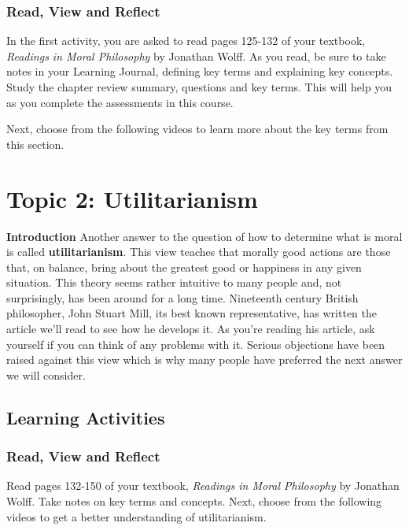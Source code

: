 \documentclass[
]{book}
\begin{document}
\begin{reflect}
\hypertarget{read-view-and-reflect-11}{%
\subsubsection*{Read, View and Reflect}\label{read-view-and-reflect-11}}

In the first activity, you are asked to read pages 125-132 of your textbook, \emph{Readings in Moral Philosophy} by Jonathan Wolff. As you read, be sure to take notes in your Learning Journal, defining key terms and explaining key concepts. Study the chapter review summary, questions and key terms. This will help you as you complete the assessments in this course.

Next, choose from the following videos to learn more about the key terms from this section.
\end{reflect}

\hypertarget{topic-2-utilitarianism}{%
\section*{Topic 2: Utilitarianism}\label{topic-2-utilitarianism}}

\textbf{Introduction}
Another answer to the question of how to determine what is moral is called \textbf{utilitarianism}. This view teaches that morally good actions are those that, on balance, bring about the greatest good or happiness in any given situation. This theory seems rather intuitive to many people and, not surprisingly, has been around for a long time. Nineteenth century British philosopher, John Stuart Mill, its best known representative, has written the article we'll read to see how he develops it.
As you're reading his article, ask yourself if you can think of any problems with it. Serious objections have been raised against this view which is why many people have preferred the next answer we will consider.

\hypertarget{learning-activities-9}{%
\subsection*{Learning Activities}\label{learning-activities-9}}

\begin{reflect}
\hypertarget{read-view-and-reflect-12}{%
\subsubsection*{Read, View and Reflect}\label{read-view-and-reflect-12}}

Read pages 132-150 of your textbook, \emph{Readings in Moral Philosophy} by Jonathan
Wolff. Take notes on key terms and concepts.
Next, choose from the following videos to get a better understanding of
utilitarianism.
\end{reflect}
\end{document}
